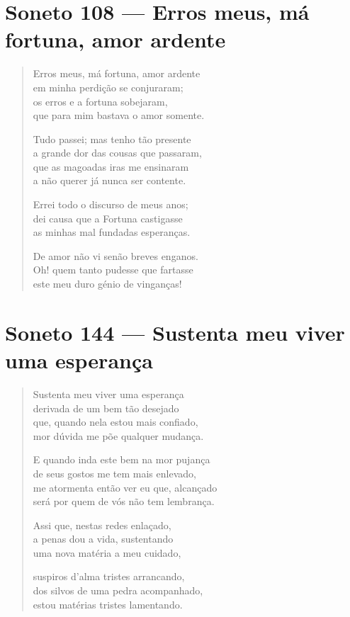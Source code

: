 \documentclass[10pt,a5paper,oneside]{book}
\begin{document}
\chapter{Soneto 108 --- Erros meus, má fortuna, amor ardente}

\begin{verse}
Erros meus, má fortuna, amor ardente\\
em minha perdição se conjuraram;\\
os erros e a fortuna sobejaram,\\
que para mim bastava o amor somente.

Tudo passei; mas tenho tão presente\\
a grande dor das cousas que passaram,\\
que as magoadas iras me ensinaram\\
a não querer já nunca ser contente.

Errei todo o discurso de meus anos;\\
dei causa que a Fortuna castigasse\\
as minhas mal fundadas esperanças.

De amor não vi senão breves enganos.\\
Oh! quem tanto pudesse que fartasse\\
este meu duro génio de vinganças!
\end{verse}

\chapter{Soneto 144 --- Sustenta meu viver uma esperança}

\begin{verse}
Sustenta meu viver uma esperança\\
derivada de um bem tão desejado\\
que, quando nela estou mais confiado,\\
mor dúvida me põe qualquer mudança.

E quando inda este bem na mor pujança\\
de seus gostos me tem mais enlevado,\\
me atormenta então ver eu que, alcançado\\
será por quem de vós não tem lembrança.

Assi que, nestas redes enlaçado,\\
a penas dou a vida, sustentando\\
uma nova matéria a meu cuidado,

suspiros d'alma tristes arrancando,\\
dos silvos de uma pedra acompanhado,\\
estou matérias tristes lamentando.
\end{verse}
\end{document}
